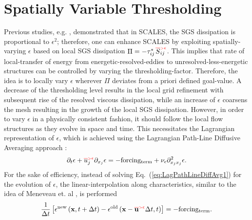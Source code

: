 \chapter{Spatially Variable Thresholding}
\label{thresholdchapter}


Previous studies, e.g. \cite{JOT_2005}, demonstrated that in SCALES, the SGS dissipation  is proportional to  $\epsilon ^2$;
therefore, one can enhance SCALES by exploiting spatially-varying $\epsilon$  based on local SGS dissipation
$\Pi = -\tau_{ij}^* %
               {{\left.\red\overline{\bl S}_{\bl ij} \rule{-8pt}{6pt}\right.}^{\red {\scriptscriptstyle >} \epsilon}}
               $.
This implies that rate of local-transfer of energy from
energetic-resolved-eddies to unresolved-less-energetic structures can be controlled by varying the thresholding-factor.
Therefore, the idea is to locally vary $\epsilon$ wherever $\Pi$ deviates from a priori defined goal-value.
A decrease of the thresholding level results in the local grid refinement with subsequent rise of the resolved viscous dissipation, while an increase of $\epsilon$ coarsens the mesh resulting in  the growth of the local SGS dissipation.
%
%
%
However, in order to vary  $\epsilon$ in a physically consistent fashion, it should follow the local flow structures as they evolve in space and time. This necessitates the Lagrangian representation of  $\epsilon$, which is achieved using the  Lagrangian Path-Line Diffusive Averaging approach \cite{JOT_2008}:
\begin{equation}
        \label{eq:LagPathLineDiffAvg1} \vspace*{3pt}
        \partial_{t}{\epsilon}
        + \bareps[u]_j \partial_{x_j}{\epsilon}
        = - {\rm forcing_{term} }
        + \nu_{\epsilon} \partial_{x_jx_j}^2{\epsilon} .
\end{equation}
%
For the sake of efficiency, instead of solving Eq.~(\ref{eq:LagPathLineDiffAvg1}) for the evolution of $\epsilon$, the linear-interpolation along characteristics, similar to the idea of Meneveau et. al \cite{Meneveau_LagrangianSGS_JFM_1996}, is performed
\begin{equation}
        \label{eq:LagPathLineDiffAvg2} \vspace*{3pt}
        \frac 1 {\Delta t} \left[ \epsilon^{\rm new} \left( {\mathbf x},t+\Delta t\right)
                                - \epsilon^{\rm old} \left( {\mathbf x}-\bareps[{\mathbf u}] \Delta t,t\right) \right]
        = {\rm - forcing_{term} }.
\end{equation}
